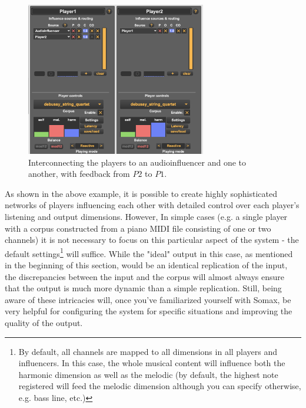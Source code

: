  \begin{figure}[h!]
    \centering        
 	\includegraphics[width=0.7\textwidth, keepaspectratio]{img/twoplayers.png}
    \caption{Interconnecting the players to an audioinfluencer and one to another, with feedback from $P2$ to $P1$.}
    \label{fig:myFig}
\end{figure}

As shown in the above example, it is possible to create highly sophisticated networks of players influencing each other with detailed control over each player's listening and output dimensions. However, In simple cases (e.g. a single player with a corpus constructed from a piano MIDI file consisting of one or two channels) it is not necessary to focus on this particular aspect of the system -  the default settings\footnote{By default,  all channels are mapped to all dimensions in all players and influencers. In this case, the whole musical content will influence both the harmonic dimension as well as the melodic (by default, the highest note registered will feed the melodic dimension although you can specify otherwise, e.g. bass line, etc.)} will suffice. While the "ideal" output in this case, as mentioned in the beginning of this section, would be an identical replication of the input, the discrepancies between the input and the corpus will almost always ensure that the output is much more dynamic than a simple replication. Still, being aware of these intricacies will, once you've familiarized yourself with Somax, be very helpful for configuring the system for specific situations and improving the quality of the output.
